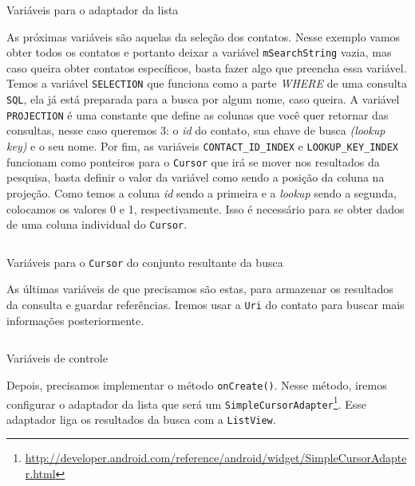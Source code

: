 \documentclass[a4paper,12pt,brazil,oneside]{book}
\begin{document}
\begin{singlespace}
		\begin{listing}[H]
		\inputminted[linenos=true,fontsize=\small,frame=lines, framesep=2mm, tabsize=2,numbersep=5pt]{java}{src/api/contacts/fromto.java}
		\caption{Variáveis para o adaptador da lista}
		\label{code:contactadaptervar}
		\end{listing} 	

	As próximas variáveis são aquelas da seleção dos contatos. Nesse exemplo vamos obter todos os contatos e portanto deixar a variável \texttt{mSearchString} vazia, mas caso queira obter contatos específicos, basta fazer algo que preencha essa variável. Temos a variável \texttt{SELECTION} que funciona como a parte \emph{WHERE} de uma consulta \texttt{SQL}, ela já está preparada para a busca por algum nome, caso queira. A variável \texttt{PROJECTION} é uma constante que define as colunas que você quer retornar das consultas, nesse caso queremos 3: o \emph{id} do contato, sua chave de busca \emph{(lookup key)} e o seu nome. Por fim, as variáveis \texttt{CONTACT\_ID\_INDEX} e \texttt{LOOKUP\_KEY\_INDEX} funcionam como ponteiros para o \texttt{Cursor} que irá se mover nos resultados da pesquisa, basta definir o valor da variável como sendo a posição da coluna na projeção. Como temos a coluna \emph{id} sendo a primeira e a \emph{lookup} sendo a segunda, colocamos os valores 0 e 1, respectivamente. Isso é necessário para se obter dados de uma coluna individual do \texttt{Cursor}.

		\begin{listing}[H]
		\inputminted[linenos=true,fontsize=\small,frame=lines, framesep=2mm, tabsize=2,numbersep=5pt]{java}{src/api/contacts/morevar.java}
		\caption{Variáveis para o \texttt{Cursor} do conjunto resultante da busca}
		\label{code:contactcursorvar}
		\end{listing} 	

	As últimas variáveis de que precisamos são estas, para armazenar os resultados da consulta e guardar referências. Iremos usar a \texttt{Uri} do contato para buscar mais informações posteriormente.

		\begin{listing}[H]
		\inputminted[linenos=true,fontsize=\small,frame=lines, framesep=2mm, tabsize=2,numbersep=5pt]{java}{src/api/contacts/lastvar.java}
		\caption{Variáveis de controle}
		\label{code:contactlastvar}
		\end{listing} 	

	Depois, precisamos implementar o método \texttt{onCreate()}. Nesse método, iremos configurar o adaptador da lista que será um \texttt{SimpleCursorAdapter}\footnote{\href{http://developer.android.com/reference/android/widget/SimpleCursorAdapter.html}{http://developer.android.com/reference/android/widget/SimpleCursorAdapter.html}}. Esse adaptador liga os resultados da busca com a \texttt{ListView}.


\end{singlespace}
\end{document}
